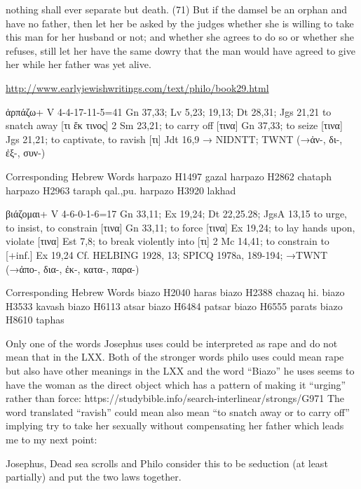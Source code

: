 \documentclass[11pt]{article}
\begin{document}
nothing shall ever separate but death. (71) But if the damsel be an orphan and have no father, then let her be asked by the judges whether she is willing to take this man for her husband or not; and whether she agrees to do so or whether she refuses, still let her have the same dowry that the man would have agreed to give her while her father was yet alive.

\url{http://www.earlyjewishwritings.com/text/philo/book29.html}


\begin{greek} ἁρπάζω+ V 4-4-17-11-5=41
Gn 37,33; Lv 5,23; 19,13; Dt 28,31; Jgs 21,21
to snatch away [τι ἔκ τινος] 2 Sm 23,21; to carry off [τινα] Gn 37,33; to seize [τινα] Jgs 21,21; to
captivate, to ravish [τι] Jdt 16,9
→ NIDNTT; TWNT
(→ἀν-, δι-, ἐξ-, συν-) 
\end{greek}

Corresponding Hebrew Words
harpazo H1497 gazal
harpazo H2862 chataph
harpazo H2963 taraph qal.,pu.
harpazo H3920 lakhad

\begin{greek}
βιάζομαι+ V 4-6-0-1-6=17
Gn 33,11; Ex 19,24; Dt 22,25.28; JgsA 13,15
to urge, to insist, to constrain [τινα] Gn 33,11; to force [τινα] Ex 19,24; to lay hands upon, violate [τινα]
Est 7,8; to break violently into [τι] 2 Mc 14,41; to constrain to [+inf.] Ex 19,24
Cf. HELBING 1928, 13; SPICQ 1978a, 189-194; →TWNT
(→ἀπο-, δια-, ἐκ-, κατα-, παρα-) 
\end{greek}
Corresponding Hebrew Words
biazo H2040 haras
biazo H2388 chazaq hi.
biazo H3533 kavash
biazo H6113 atsar
biazo H6484 patsar
biazo H6555 parats
biazo H8610 taphas


 Only one of the words Josephus uses could be interpreted as rape and do not mean that in the LXX. Both of the stronger words philo uses could mean rape but also have other meanings in the LXX and the word “Biazo” he uses seems to have the woman as the direct object which has a pattern of making it “urging” rather than force: https://studybible.info/search-interlinear/strongs/G971 The word translated “ravish” could mean also mean “to snatch away or to carry off” implying try to take her sexually without compensating her father which leads me to my next point:


Josephus, Dead sea scrolls and Philo consider this to be seduction (at least partially) and put the two laws together. 
\end{document}
